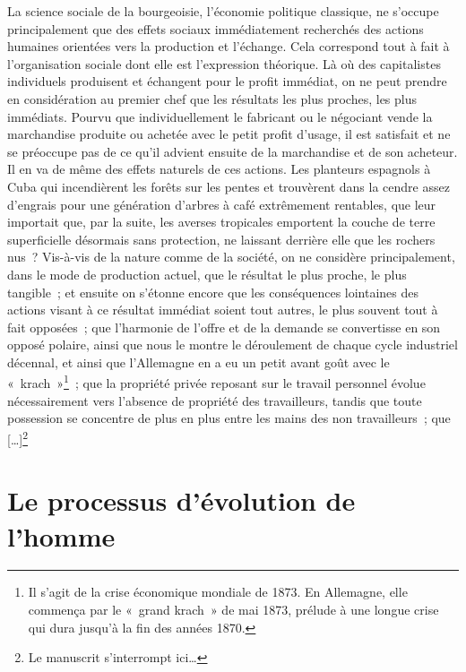 \documentclass[french,twoside]{book} %
\begin{document}
La science sociale de la bourgeoisie, l’économie politique classique, ne s’occupe principalement que des effets sociaux immédiatement recherchés des actions humaines orientées vers la production et l’échange. Cela correspond tout à fait à l’organisation sociale dont elle est l’expression théorique. Là où des capitalistes individuels produisent et échangent pour le profit immédiat, on ne peut prendre en considération au premier chef que les résultats les plus proches, les plus immédiats. Pourvu que individuellement le fabricant ou le négociant vende la marchandise produite ou achetée avec le petit profit d’usage, il est satisfait et ne se préoccupe pas de ce qu’il advient ensuite de la marchandise et de son acheteur. Il en va de même des effets naturels de ces actions. Les planteurs espagnols à Cuba qui incendièrent les forêts sur les pentes et trouvèrent dans la cendre assez d’engrais pour une génération d’arbres à café extrêmement rentables, que leur importait que, par la suite, les averses tropicales emportent la couche de terre superficielle désormais sans protection, ne laissant derrière elle que les rochers nus ? Vis-à-vis de la nature comme de la société, on ne considère principalement, dans le mode de production actuel, que le résultat le plus proche, le plus tangible ; et ensuite on s’étonne encore que les conséquences lointaines des actions visant à ce résultat immédiat soient tout autres, le plus souvent tout à fait opposées ; que l’harmonie de l’offre et de la demande se convertisse en son opposé polaire, ainsi que nous le montre le déroulement de chaque cycle industriel décennal, et ainsi que l’Allemagne en a eu un petit avant goût avec le « krach »\footnote{Il s’agit de la crise économique mondiale de 1873. En Allemagne, elle commença par le « grand krach » de mai 1873, prélude à une longue crise qui dura jusqu’à la fin des années 1870.} ; que la propriété privée reposant sur le travail personnel évolue nécessairement vers l’absence de propriété des travailleurs, tandis que toute possession se concentre de plus en plus entre les mains des non travailleurs ; que […]\footnote{Le manuscrit s’interrompt ici…}
\section[{Le processus d’évolution de l’homme}]{Le processus d’évolution de l’homme\protect\footnotemark }\renewcommand{\leftmark}{Le processus d’évolution de l’homme}
\end{document}
